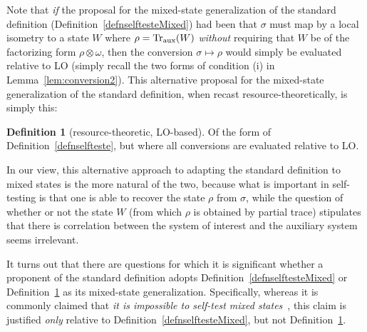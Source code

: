 \documentclass[prx,11pt,letterpaper,twocolumn,accepted=2023-11-27]{quantumarticle}
\theoremstyle{plain}
\theoremstyle{definition}
\newtheorem{defn}{Definition}
\begin{document}
Note that {\em if} the proposal for the mixed-state generalization of the standard definition (Definition~\ref{defnselftesteMixed})  had been that $\sigma$ must map
 by a local isometry to a state $W$ where $\rho = {\rm Tr}_{\rm aux}(W)$ {\em without} requiring that $W$ be of the factorizing form $\rho \otimes \omega$, then  the conversion $\sigma \mapsto \rho$ would simply be evaluated relative to LO (simply recall the two forms of condition (i) in Lemma~\ref{lem:conversion2}).  This alternative proposal for the mixed-state generalization of the standard definition, when  
 recast resource-theoretically, is simply this:
\begin{defn}[resource-theoretic, LO-based]
\label{defnselftesteLObased}
Of the form of Definition~\ref{defnselfteste}, but where all conversions are evaluated relative to LO. 
\end{defn}



In our view, this alternative approach to adapting the standard definition to mixed states is the more natural of the two, 
because what is important in self-testing is that one is able to recover the state $\rho$ from $\sigma$, while the question of whether or not the state $W$ (from which $\rho$ is obtained by partial trace) stipulates that there is correlation between the system of interest and the auxiliary system seems irrelevant. 

It turns out that there are questions for which it is significant whether a proponent of the standard definition adopts Definition~\ref{defnselftesteMixed} or Definition~\ref{defnselftesteLObased} as its mixed-state generalization. Specifically, whereas it is commonly claimed that {\em it is impossible to self-test mixed states}~\cite{Coladangelo2017,Supi2018Mutliselftest,vsupic2020self}, this claim is justified {\em only} relative to 
Definition~\ref{defnselftesteMixed}, but not 
Definition~\ref{defnselftesteLObased}.
\end{document}
